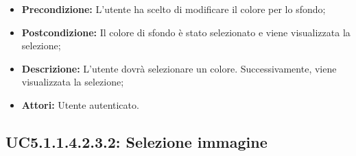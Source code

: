 \begin{itemize}
	\item \textbf{Precondizione:} L'utente ha scelto di modificare il colore per lo sfondo;
	\item \textbf{Postcondizione:} Il colore di sfondo è stato selezionato e viene visualizzata la selezione;
	\item \textbf{Descrizione:} L'utente dovrà selezionare un colore.  Successivamente, viene visualizzata la selezione;
	\item \textbf{Attori:} Utente autenticato.
\end{itemize}
\subsection{ UC5.1.1.4.2.3.2: Selezione immagine}

